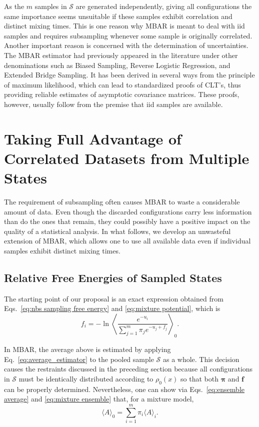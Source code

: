 \documentclass[aip,jcp,reprint,amsmath,amssymb]{revtex4-1}
\newcommand{\vt}[1]{\boldsymbol{\mathbf{#1}}}           %
\begin{document}
As the $m$ samples in $\mathcal S$ are generated independently, giving all configurations the same importance seems unsuitable if these samples exhibit correlation and distinct mixing times. This is one reason why MBAR is meant to deal with iid samples and requires subsampling whenever some sample is originally correlated.\cite{Shirts_2008} Another important reason is concerned with the determination of uncertainties. The MBAR estimator had previously appeared in the literature under other denominations such as Biased Sampling,\cite{Vardi_1985, *Gill_1988} Reverse Logistic Regression,\cite{Geyer_1994} and Extended Bridge Sampling.\cite{Meng_1996, Kong_2003, Tan_2004} It has been derived in several ways from the principle of maximum likelihood, which can lead to standardized proofs of CLT's, thus providing reliable estimates of asymptotic covariance matrices.\cite{Pawitan_2001, Greene_2012} These proofs, however, usually follow from the premise that iid samples are available.

\section{Taking Full Advantage of Correlated Datasets from Multiple States}

The requirement of subsampling often causes MBAR to waste a considerable amount of data. Even though the discarded configurations carry less information than do the ones that remain, they could possibly have a positive impact on the quality of a statistical analysis. In what follows, we develop an unwasteful extension of MBAR, which allows one to use all available data even if individual samples exhibit distinct mixing times.

\subsection{Relative Free Energies of Sampled States}

The starting point of our proposal is an exact expression obtained from Eqs.~\eqref{eq:nbs sampling free energy} and \eqref{eq:mixture potential}, which is
\begin{equation}
\label{eq:free energy exact}
f_i = -\ln \left\langle \frac{e^{-u_i}}{\sum_{j=1}^m \pi_j e^{-u_j + f_j}} \right\rangle_0.
\end{equation}

In MBAR, the average above is estimated by applying Eq.~\eqref{eq:average_estimator} to the pooled sample $\mathcal S$ as a whole. This decision causes the restraints discussed in the preceding section because all configurations in $\mathcal S$ must be identically distributed according to $\rho_0(x)$ so that both $\vt \pi$ and $\vt f$ can be properly determined. Nevertheless, one can show via Eqs.~\eqref{eq:ensemble average} and \eqref{eq:mixture ensemble} that, for a mixture model,
\begin{equation}
\label{eq:mixture average}
\langle A \rangle_0 = \sum_{i=1}^m \pi_i \langle A \rangle_i.
\end{equation}
\end{document}
